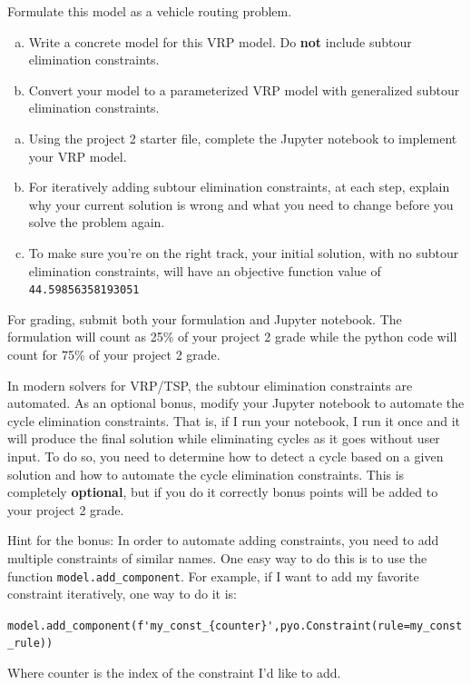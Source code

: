 \documentclass[11pt]{article}
\theoremstyle{definition}
\begin{document}
\newpage

 Formulate this model as a vehicle routing problem.
	\begin{enumerate}[a.]
	\item Write a concrete model for this VRP model. Do \textbf{not} include subtour elimination constraints.
	\item Convert your model to a parameterized VRP model with generalized subtour elimination constraints.
	\end{enumerate}

\vspace{0.5in}

\begin{enumerate}[a.]
\item Using the project 2 starter file, complete the Jupyter notebook to implement your VRP model.
\item For iteratively adding subtour elimination constraints, at each step, explain why your current solution is wrong and what you need to change before you solve the problem again.
\item To make sure you're on the right track, your initial solution, with no subtour elimination constraints, will have an objective function value of \verb|44.59856358193051|
\end{enumerate}

\vspace{0.5in}

 For grading, submit both your formulation and Jupyter notebook. The formulation will count as 25\% of your project 2 grade while the python code will count for 75\% of your project 2 grade.

\vspace{0.5in}

 In modern solvers for VRP/TSP, the subtour elimination constraints are automated. As an optional bonus, modify your Jupyter notebook to automate the cycle elimination constraints. That is, if I run your notebook, I run it once and it will produce the final solution while eliminating cycles as it goes without user input. To do so, you need to determine how to detect a cycle based on a given solution and how to automate the cycle elimination constraints. This is completely \textbf{optional}, but if you do it correctly bonus points will be added to your project 2 grade.

Hint for the bonus: In order to automate adding constraints, you need to add multiple constraints of similar names. One easy way to do this is to use the function \verb|model.add_component|. For example, if I want to add my favorite constraint iteratively, one way to do it is:

\verb|model.add_component(f'my_const_{counter}',pyo.Constraint(rule=my_const_rule))|

Where counter is the index of the constraint I'd like to add.
\end{document}
